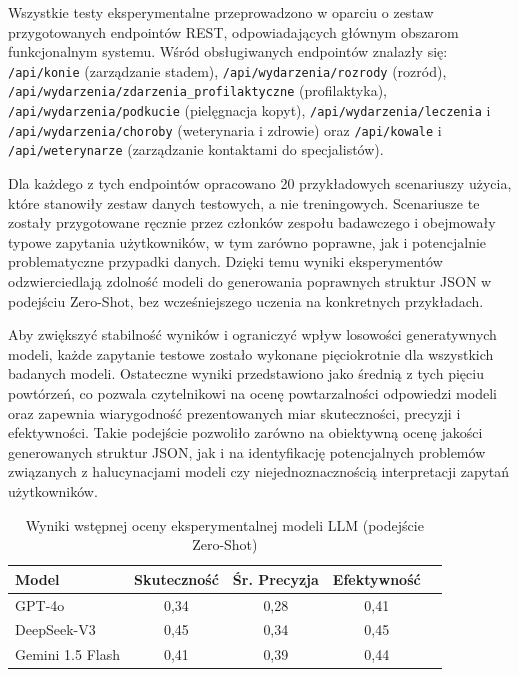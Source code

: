 
Wszystkie testy eksperymentalne przeprowadzono w oparciu o zestaw przygotowanych endpointów REST, odpowiadających głównym obszarom funkcjonalnym systemu. Wśród obsługiwanych endpointów znalazły się: \texttt{/api/konie} (zarządzanie stadem), \texttt{/api/wydarzenia/rozrody} (rozród), \texttt{/api/wydarzenia/zdarzenia\_profilaktyczne} (profilaktyka), \texttt{/api/wydarzenia/podkucie} (pielęgnacja kopyt), \texttt{/api/wydarzenia/leczenia} i \texttt{/api/wydarzenia/choroby} (weterynaria i zdrowie) oraz \texttt{/api/kowale} i \texttt{/api/weterynarze} (zarządzanie kontaktami do specjalistów).

Dla każdego z tych endpointów opracowano 20 przykładowych scenariuszy użycia, które stanowiły zestaw danych testowych, a nie treningowych. Scenariusze te zostały przygotowane ręcznie przez członków zespołu badawczego i obejmowały typowe zapytania użytkowników, w tym zarówno poprawne, jak i potencjalnie problematyczne przypadki danych. Dzięki temu wyniki eksperymentów odzwierciedlają zdolność modeli do generowania poprawnych struktur JSON w podejściu Zero-Shot, bez wcześniejszego uczenia na konkretnych przykładach.

Aby zwiększyć stabilność wyników i ograniczyć wpływ losowości generatywnych modeli, każde zapytanie testowe zostało wykonane pięciokrotnie dla wszystkich badanych modeli. Ostateczne wyniki przedstawiono jako średnią z tych pięciu powtórzeń, co pozwala czytelnikowi na ocenę powtarzalności odpowiedzi modeli oraz zapewnia wiarygodność prezentowanych miar skuteczności, precyzji i efektywności. Takie podejście pozwoliło zarówno na obiektywną ocenę jakości generowanych struktur JSON, jak i na identyfikację potencjalnych problemów związanych z halucynacjami modeli czy niejednoznacznością interpretacji zapytań użytkowników.

\begin{table}[h!]
\centering
\caption{Wyniki wstępnej oceny eksperymentalnej modeli LLM (podejście Zero-Shot)}
\label{tab:llm_comparison1}
\begin{tabular}{|l|c|c|c|c|}
\hline
\textbf{Model} & \textbf{Skuteczność} & \textbf{Śr. Precyzja} & \textbf{Efektywność} \\ \hline
GPT-4o         & 0,34                 & 0,28                  & 0,41                 \\ \hline
DeepSeek-V3    & 0,45                 & 0,34                  & 0,45                 \\ \hline
Gemini 1.5 Flash & 0,41               & 0,39                  & 0,44                 \\ \hline
\end{tabular}
\end{table}

